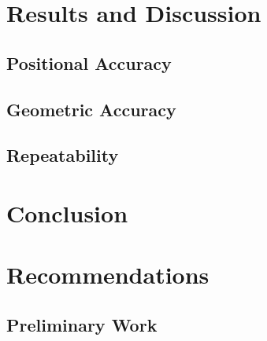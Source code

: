 \documentclass[conference]{IEEEtran}
\begin{document}
		
\section{Results and Discussion}
\label{results_section}
	\subsection{Positional Accuracy}
	\subsection{Geometric Accuracy}
	\subsection{Repeatability}
	
\section{Conclusion}
\label{conclusion_section}

\section{Recommendations}
\label{recommendations_section}

\newpage
%

\newpage
\begin{appendices}
	\section{Preliminary Work}
	

\end{appendices}
\end{document}
